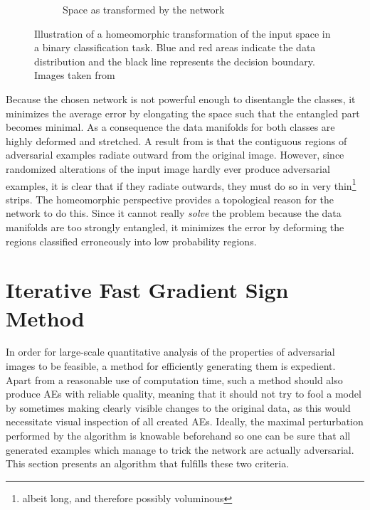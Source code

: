 \documentclass[11pt, a4paper]{article}
\begin{document}
\begin{figure}[h!tb]
\begin{subfigure}[t]{0.45\textwidth}
        \caption{Space as transformed by the network}
        \label{fig:network-homeomorphism-end}
    \end{subfigure}
    \caption[Network function as homeomorphic transformation of input space]{Illustration of a homeomorphic transformation of the input space in a binary classification task. Blue and red areas indicate the data distribution and the black line represents the decision boundary. Images taken from \cite{neural-network-homeomorphics-transformation}}
    \label{fig:network-homeomorphism}
\end{figure}

Because the chosen network is not powerful enough to disentangle the classes, it minimizes the average error by elongating the space such that the entangled part becomes minimal. As a consequence the data manifolds for both classes are highly deformed and stretched. A result from \cite{explaining-and-harnessing-adversarial-examples} is that the contiguous regions of adversarial examples radiate outward from the original image. However, since randomized alterations of the input image hardly ever produce adversarial examples, it is clear that if they radiate outwards, they must do so in very thin\footnote{albeit long, and therefore possibly voluminous} strips. The homeomorphic perspective provides a topological reason for the network to do this. Since it cannot really \emph{solve} the problem because the data manifolds are too strongly entangled, it minimizes the error by deforming the regions classified erroneously into low probability regions.










\section{Iterative Fast Gradient Sign Method}
\label{sec:iterative-fgsm}
In order for large-scale quantitative analysis of the properties of adversarial images to be feasible, a method for efficiently generating them is expedient. Apart from a reasonable use of computation time, such a method should also produce AEs with reliable quality, meaning that it should not try to fool a model by sometimes making clearly visible changes to the original data, as this would necessitate visual inspection of all created AEs. Ideally, the maximal perturbation performed by the algorithm is knowable beforehand so one can be sure that all generated examples which manage to trick the network are actually adversarial. This section presents an algorithm that fulfills these two criteria.
\end{document}
